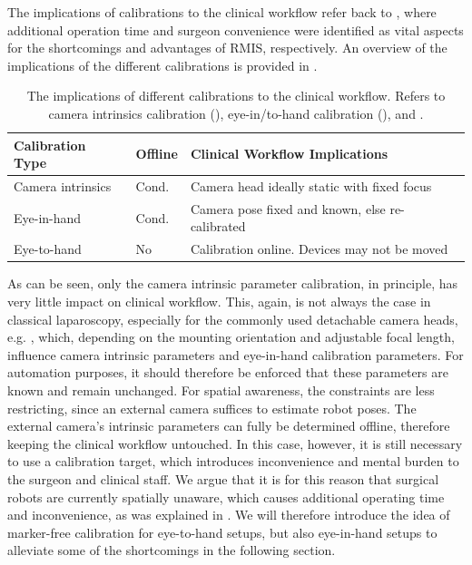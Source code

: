 The implications of calibrations to the clinical workflow refer back to , where additional operation time and surgeon convenience were identified as vital aspects for the shortcomings and advantages of RMIS, respectively. An overview of the implications of the different calibrations is provided in .
\begin{table}[]
\centering
\caption{The implications of different calibrations to the clinical workflow. Refers to camera intrinsics calibration (), eye-in/to-hand calibration (), and .}
\label{in:tab:calibrations}
\begin{tabular}{@{}lll@{}}
\toprule
Calibration Type  & Offline       & Clinical Workflow Implications \\ \midrule
Camera intrinsics & Cond.         & Camera head ideally static with fixed focus \\
Eye-in-hand       & Cond. & Camera pose fixed and known, else re-calibrated \\
Eye-to-hand       & No            &  Calibration online. Devices may not be moved \\ \bottomrule
\end{tabular}
\end{table}
As can be seen, only the camera intrinsic parameter calibration, in principle, has very little impact on clinical workflow. This, again, is not always the case in classical laparoscopy, especially for the commonly used detachable camera heads, e.g. , which, depending on the mounting orientation and adjustable focal length, influence camera intrinsic parameters and eye-in-hand calibration parameters. For automation purposes, it should therefore be enforced that these parameters are known and remain unchanged. For spatial awareness, the constraints are less restricting, since an external camera suffices to estimate robot poses. The external camera's intrinsic parameters can fully be determined offline, therefore keeping the clinical workflow untouched. In this case, however, it is still necessary to use a calibration target, which introduces inconvenience and mental burden to the surgeon and clinical staff. We argue that it is for this reason that surgical robots are currently spatially unaware, which causes additional operating time and inconvenience, as was explained in . We will therefore introduce the idea of marker-free calibration for eye-to-hand setups, but also eye-in-hand setups to alleviate some of the shortcomings in the following section.

